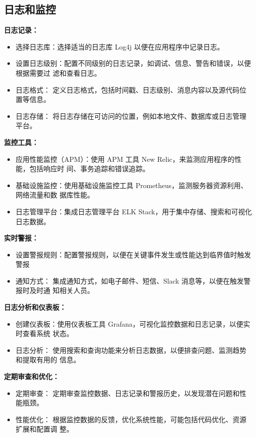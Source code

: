 \documentclass{article}
\begin{document}
\subsection{日志和监控}

\textbf{日志记录：}
\begin{itemize}
  \item 选择日志库：选择适当的日志库 Log4j 以便在应用程序中记录日志。
  \item 设置日志级别：配置不同级别的日志记录，如调试、信息、警告和错误，以便根据需要过
  滤和查看日志。
  \item 日志格式： 定义日志格式，包括时间戳、日志级别、消息内容以及源代码位置等信息。
  \item 日志存储： 将日志存储在可访问的位置，例如本地文件、数据库或日志管理平台。
\end{itemize}

\textbf{监控工具：}
\begin{itemize}
  \item 应用性能监控（APM）：使用 APM 工具 New Relic，来监测应用程序的性能，包括响应时
  间、事务追踪和错误追踪。
  \item 基础设施监控：使用基础设施监控工具 Prometheus，监测服务器资源利用、网络流量和数
  据库性能。
  \item 日志管理平台：集成日志管理平台 ELK Stack，用于集中存储、搜索和可视化日志数据。
\end{itemize}

\textbf{实时警报：}
\begin{itemize}
  \item 设置警报规则：配置警报规则，以便在关键事件发生或性能达到临界值时触发警报
  \item 通知方式： 集成通知方式，如电子邮件、短信、Slack 消息等，以便在触发警报时及时通
  知相关人员。
\end{itemize}

\textbf{日志分析和仪表板：}
\begin{itemize}
  \item 创建仪表板：使用仪表板工具 Grafana，可视化监控数据和日志记录，以便实时查看系统
  状态。
  \item 日志分析： 使用搜索和查询功能来分析日志数据，以便排查问题、监测趋势和提取有用的
  信息。
\end{itemize}

\textbf{定期审查和优化：}
\begin{itemize}
  \item 定期审查： 定期审查监控数据、日志记录和警报历史，以发现潜在问题和性能瓶颈。
  \item 性能优化： 根据监控数据的反馈，优化系统性能，可能包括代码优化、资源扩展和配置调
  整。
\end{itemize}
\end{document}
